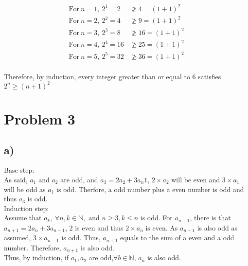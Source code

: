 \documentclass{article}
\begin{document}
    \begin{align*}
        \text {For}\ n=1, \ 2^1=2&\ngeq 4=(1+1)^2\\
        \text {For}\ n=2, \ 2^2=4&\ngeq 9=(1+1)^2\\
        \text {For}\ n=3, \ 2^3=8&\ngeq 16=(1+1)^2\\
        \text {For}\ n=4, \ 2^4=16&\ngeq 25=(1+1)^2\\
        \text {For}\ n=5, \ 2^5=32&\ngeq 36=(1+1)^2\\
    \end{align*}
    
    Therefore, by induction, every integer greater than or equal to 6 satisfies \(2^n\geqslant(n+1)^2\)
\newpage
\section*{Problem 3}
    \subsection*{a)}
        Base step:\\
        As said, \(a_1\) and \(a_2\) are odd, and \(a_3=2a_{2}+3a_n{1}\), \(2\times a_{2}\) will be even and \(3 \times a_1\) will be odd as \(a_1\) is odd.
        Therfore, a odd number plus a even number is odd and thus \(a_3\) is odd.\\
        Induction step:\\
        Assume that \(a_k,\ \forall n,k\in \mathbb{N}, \text{ and } n\geqslant 3, k\leqslant n\) is odd. For \(a_{n+1}\),
        there is that \(a_{n+1}=2a_n+3a_{n-1}\), \(2\) is even and thus \(2\times a_{n}\) is even. As
        \(a_{n-1}\) is also odd as assumed, \(3\times a_{n-1}\) is odd. Thus, \(a_{n+1}\) equals to the sum
        of a even and a odd number. Therefore, \(a_{n+1}\) is also odd.\\
        Thus, by induction, if \(a_1,a_2\) are odd,\(\forall b\in \mathbb{N}\), \(a_n\) is also odd.
\end{document}

